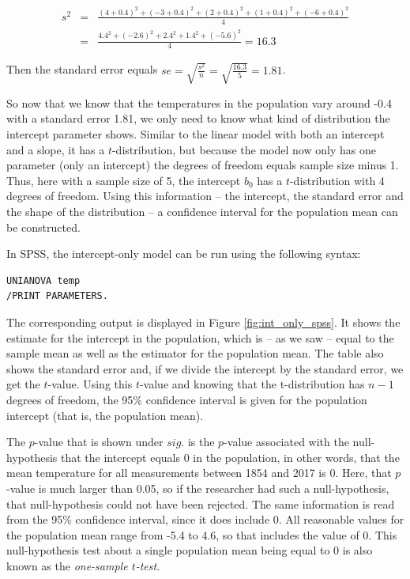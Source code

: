 \documentclass[]{book}\usepackage[]{graphicx}\usepackage[]{color}
\begin{document}
\begin{eqnarray}
s^2 &=& \frac{ (4+0.4)^2 +  (-3+0.4)^2  + (2+0.4)^2 + (1+0.4)^2   + (-6+0.4)^2 }{4} \nonumber\\
&=& \frac{4.4^2+ (-2.6)^2  + 2.4^2 + 1.4^2 +  (-5.6)^2 }{4} = 16.3 \nonumber
\end{eqnarray}

Then the standard error equals $se = \sqrt{\frac{s^2}{n}}=\sqrt{\frac{16.3}{5}}= 1.81$.

So now that we know that the temperatures in the population vary around -0.4 with a standard error 1.81, we only need to know what kind of distribution the intercept parameter shows. Similar to the linear model with both an intercept and a slope, it has a $t$-distribution, but because the model now only has one parameter (only an intercept) the degrees of freedom equals sample size minus 1. Thus, here with a sample size of 5, the intercept $b_0$ has a $t$-distribution with 4 degrees of freedom. 
Using this information -- the intercept, the standard error and the shape of the distribution -- a confidence interval for the population mean can be constructed. 

In SPSS, the intercept-only model can be run using the following syntax:


\begin{verbatim}
UNIANOVA temp 
/PRINT PARAMETERS.
\end{verbatim}

The corresponding output is displayed in Figure \ref{fig:int_only_spss}. It shows the estimate for the intercept in the population, which is -- as we saw -- equal to the sample mean as well as the estimator for the population mean. The table also shows the standard error and, if we divide the intercept by the standard error, we get the $t$-value. Using this $t$-value and knowing that the t-distribution has $n-1$ degrees of freedom, the 95\% confidence interval is given for the population intercept (that is, the population mean).  

The $p$-value that is shown under $sig.$ is the $p$-value associated with the null-hypothesis that the intercept equals 0 in the population, in other words, that the mean temperature for all measurements between 1854 and 2017 is 0. Here, that $p$-value is much larger than 0.05, so if the researcher had such a null-hypothesis, that null-hypothesis could not have been rejected. The same information is read from the 95\% confidence interval, since it does include 0. All reasonable values for the population mean range from -5.4 to 4.6, so that includes the value of 0. This null-hypothesis test about a single population mean being equal to 0 is also known as the \textit{one-sample $t$-test}. 
\end{document}
